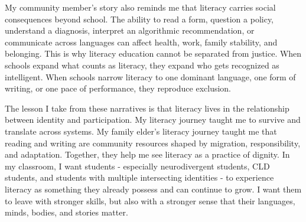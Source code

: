 \documentclass[11pt]{article}
\begin{document}
My community member's story also reminds me that literacy carries social consequences beyond school. The ability to read a form, question a policy, understand a diagnosis, interpret an algorithmic recommendation, or communicate across languages can affect health, work, family stability, and belonging. This is why literacy education cannot be separated from justice. When schools expand what counts as literacy, they expand who gets recognized as intelligent. When schools narrow literacy to one dominant language, one form of writing, or one pace of performance, they reproduce exclusion.

The lesson I take from these narratives is that literacy lives in the relationship between identity and participation. My literacy journey taught me to survive and translate across systems. My family elder's literacy journey taught me that reading and writing are community resources shaped by migration, responsibility, and adaptation. Together, they help me see literacy as a practice of dignity. In my classroom, I want students - especially neurodivergent students, CLD students, and students with multiple intersecting identities - to experience literacy as something they already possess and can continue to grow. I want them to leave with stronger skills, but also with a stronger sense that their languages, minds, bodies, and stories matter.
\end{document}
